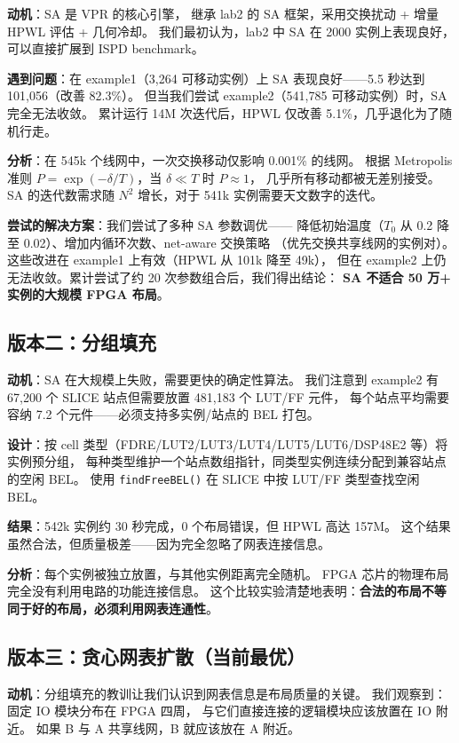 \documentclass[10.5pt,compsoc]{CjC}
\theoremstyle{mystyle}
\begin{document}
\textbf{动机}：SA 是 VPR 的核心引擎\cite{vtr2020}，
继承 lab2 的 SA 框架，采用交换扰动 + 增量 HPWL 评估 + 几何冷却。
我们最初认为，lab2 中 SA 在 2000 实例上表现良好，可以直接扩展到 ISPD benchmark。

\textbf{遇到问题}：在 example1（3,264 可移动实例）上 SA 表现良好——5.5 秒达到 101,056（改善 82.3\%）。
但当我们尝试 example2（541,785 可移动实例）时，SA 完全无法收敛。
累计运行 14M 次迭代后，HPWL 仅改善 5.1\%，几乎退化为了随机行走。

\textbf{分析}：在 545k 个线网中，一次交换移动仅影响 0.001\% 的线网。
根据 Metropolis 准则 $P = \exp(-\delta/T)$，当 $\delta \ll T$ 时 $P \approx 1$，
几乎所有移动都被无差别接受。
SA 的迭代数需求随 $N^2$ 增长，对于 541k 实例需要天文数字的迭代。

\textbf{尝试的解决方案}：我们尝试了多种 SA 参数调优——
降低初始温度（$T_0$ 从 0.2 降至 0.02）、增加内循环次数、net-aware 交换策略
（优先交换共享线网的实例对）。这些改进在 example1 上有效（HPWL 从 101k 降至 49k），
但在 example2 上仍无法收敛。累计尝试了约 20 次参数组合后，我们得出结论：
\textbf{SA 不适合 50 万+ 实例的大规模 FPGA 布局}。

\subsection{版本二：分组填充}

\textbf{动机}：SA 在大规模上失败，需要更快的确定性算法。
我们注意到 example2 有 67,200 个 SLICE 站点但需要放置 481,183 个 LUT/FF 元件，
每个站点平均需要容纳 7.2 个元件——必须支持多实例/站点的 BEL 打包。

\textbf{设计}：按 cell 类型（FDRE/LUT2/LUT3/LUT4/LUT5/LUT6/DSP48E2 等）将实例预分组，
每种类型维护一个站点数组指针，同类型实例连续分配到兼容站点的空闲 BEL。
使用 \texttt{findFreeBEL()} 在 SLICE 中按 LUT/FF 类型查找空闲 BEL。

\textbf{结果}：542k 实例约 30 秒完成，0 个布局错误，但 HPWL 高达 157M。
这个结果虽然合法，但质量极差——因为完全忽略了网表连接信息。

\textbf{分析}：每个实例被独立放置，与其他实例距离完全随机。
FPGA 芯片的物理布局完全没有利用电路的功能连接信息。
这个比较实验清楚地表明：\textbf{合法的布局不等同于好的布局，必须利用网表连通性}。

\subsection{版本三：贪心网表扩散（当前最优）}

\textbf{动机}：分组填充的教训让我们认识到网表信息是布局质量的关键。
我们观察到：固定 IO 模块分布在 FPGA 四周，
与它们直接连接的逻辑模块应该放置在 IO 附近。
如果 B 与 A 共享线网，B 就应该放在 A 附近。
\end{document}
